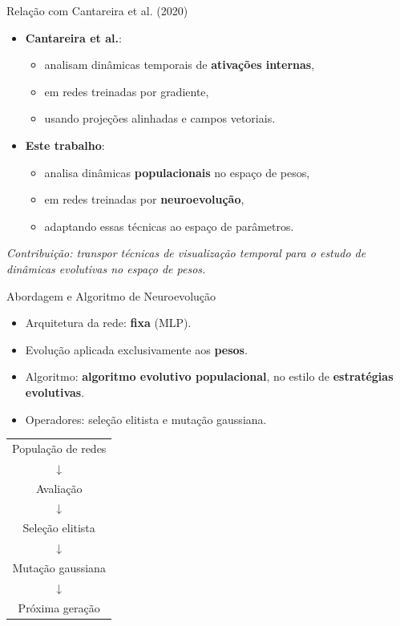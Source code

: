 \documentclass[aspectratio=169]{beamer}
\begin{document}
\begin{frame}{Relação com Cantareira et al. (2020)}

\begin{itemize}
  \item \textbf{Cantareira et al.}:
  \begin{itemize}
    \item analisam dinâmicas temporais de \textbf{ativações internas},
    \item em redes treinadas por gradiente,
    \item usando projeções alinhadas e campos vetoriais.
  \end{itemize}

  \item \textbf{Este trabalho}:
  \begin{itemize}
    \item analisa dinâmicas \textbf{populacionais} no espaço de pesos,
    \item em redes treinadas por \textbf{neuroevolução},
    \item adaptando essas técnicas ao espaço de parâmetros.
  \end{itemize}
\end{itemize}

\vspace{0.2cm}
\centering
\textit{Contribuição: transpor técnicas de visualização temporal
para o estudo de dinâmicas evolutivas no espaço de pesos.}

\end{frame}

\begin{frame}{Abordagem e Algoritmo de Neuroevolução}

\begin{itemize}
  \item Arquitetura da rede: \textbf{fixa} (MLP).
  \item Evolução aplicada exclusivamente aos \textbf{pesos}.
  \item Algoritmo: \textbf{algoritmo evolutivo populacional}, no estilo de
        \textbf{estratégias evolutivas}.
  \item Operadores: seleção elitista e mutação gaussiana.
\end{itemize}

\vspace{0.15cm}
\centering
\scriptsize
\begin{tabular}{c}
População de redes \\
↓ \\
Avaliação \\
↓ \\
Seleção elitista \\
↓ \\
Mutação gaussiana \\
↓ \\
Próxima geração
\end{tabular}

\vspace{0.15cm}
\centering

\end{frame}
\end{document}
